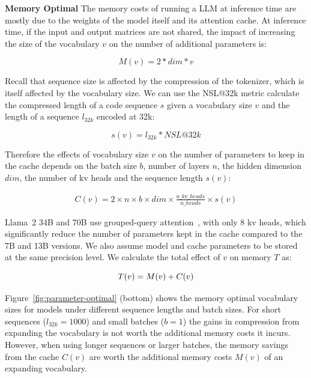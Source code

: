 \textbf{Memory Optimal} The memory costs of running a LLM at inference time are mostly due to the weights of the model itself and its attention cache. At inference time, if the input and output matrices are not shared, the impact of increasing the size of the vocabulary $v$ on the number of additional parameters is:

\begin{equation}
    M(v) = 2 * dim * v
\end{equation}

Recall that sequence size is affected by the compression of the tokenizer, which is itself affected by the vocabulary size. We can use the NSL@32k metric calculate the compressed length of a code sequence $s$ given a vocabulary size $v$ and the length of a sequence $l_{32k}$ encoded at 32k:

\begin{equation}
    s(v) = l_{32k} * NSL@32k
\end{equation}

Therefore the effects of vocabulary size $v$ on the number of parameters to keep in the cache depends on the batch size $b$, number of layers $n$, the hidden dimension $dim$, the number of kv heads and the sequence length $s(v)$:

\begin{align}
C(v) = 2 \times n \times b \times dim \times \frac{n\_kv\_heads}{n\_heads} \times s(v)
\end{align}

Llama~2 34B and 70B use grouped-query attention~\citep{ainslie2023gqa}, with only 8 kv heads, which significantly reduce the number of parameters kept in the cache compared to the 7B and 13B versions. We also assume model and cache parameters to be stored at the same precision level. We calculate the total effect of $v$ on memory $T$ as:

\begin{equation}\label{eq:eq1}
T(v) = M(v) + C(v) \\
\end{equation}

Figure~\ref{fig:parameter-optimal} (bottom) shows the memory optimal vocabulary sizes for models under different sequence lengths and batch sizes. For short sequences ($l_{32k}=1000$) and small batches ($b=1$) the gains in compression from expanding the vocabulary is not worth the additional memory costs it incurs. However, when using longer sequences or larger batches, the memory savings from the cache $C(v)$ are worth the additional memory costs $M(v)$ of an expanding vocabulary.

